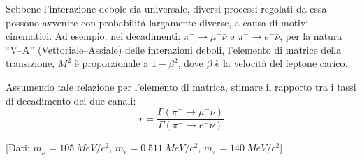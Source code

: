 \begin{Exercise}
  Sebbene l'interazione debole sia universale, diversi processi
  regolati da essa possono avvenire con probabilit\`a largamente
  diverse, a causa di motivi cinematici. Ad esempio, nei decadimenti:
  $\pi^- \to \mu^-\bar \nu$ e $\pi^- \to e^-\bar \nu$, per la natura
  ``V--A'' (Vettoriale--Assiale) delle interazioni deboli, l'elemento
  di matrice della transizione, $M^2$ \`e proporzionale a $1-\beta^2$,
  dove $\beta$ \`e la velocit\`a del leptone carico.

  \Question Assumendo tale relazione per l'elemento di matrica,
  stimare il rapporto tra i tassi di decadimento dei due canali:
  \[
  r = \frac{\Gamma(\pi^- \to \mu^-\bar \nu)}{\Gamma(\pi^- \to e^-\bar \nu)}
  \]

  [Dati: $m_\mu = \SI{105}{MeV/c^2}$, $m_e = \SI{0.511}{MeV/c^2}$, $m_\pi = \SI{140}{MeV/c^2}$]
\end{Exercise}
